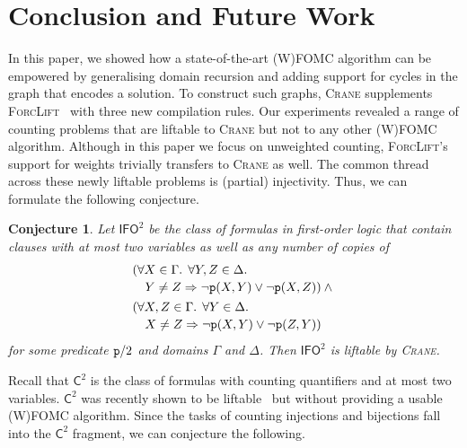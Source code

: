 \documentclass{article}
\newtheorem{conjecture}{Conjecture}
\theoremstyle{definition}
\theoremstyle{remark}
\newcommand{\Ctwo}{$\mathsf{C}^{2}$}
\newcommand{\IFO}{$\mathsf{I}\mathsf{FO}^{2}$}
\begin{document}
\section{Conclusion and Future Work}\label{sec:conclusion}

In this paper, we showed how a state-of-the-art (W)FOMC algorithm can be
empowered by generalising domain recursion and adding support for cycles in the
graph that encodes a solution. To construct such graphs, \textsc{Crane}
supplements \textsc{ForcLift}~\cite{DBLP:conf/ijcai/BroeckTMDR11} with three
new compilation rules. Our experiments revealed a range of counting problems
that are liftable to \textsc{Crane} but not to any other (W)FOMC algorithm.
Although in this paper we focus on unweighted counting, \textsc{ForcLift}'s
support for weights trivially transfers to \textsc{Crane} as well. The common
thread across these newly liftable problems is (partial) injectivity. Thus, we
can formulate the following conjecture.

\begin{conjecture}
  Let \IFO{} be the class of formulas in first-order logic that contain clauses
  with at most two variables as well as any number of copies of
  \begin{align*}
    &\begin{multlined}[t]
      (\forall X \in \Gamma\text{. }\forall Y, Z \in \Delta\text{. }\\
      Y \ne Z \Rightarrow \neg \texttt{\textup{p}}(X, Y) \lor \neg \texttt{\textup{p}}(X, Z)) \land{}
    \end{multlined}\\
    &\begin{multlined}[t]
      (\forall X, Z \in \Gamma\text{. }\forall Y \in \Delta\text{. }\\
      X \ne Z \Rightarrow \neg \texttt{\textup{p}}(X, Y) \lor \neg \texttt{\textup{p}}(Z, Y))
    \end{multlined}
  \end{align*}
  for some predicate $\texttt{\textup{p}}/2$ and domains $\Gamma$ and $\Delta$.
  Then \IFO{} is liftable by \textsc{Crane}.
\end{conjecture}

Recall that \Ctwo{} is the class of formulas with counting quantifiers and at
most two variables. \Ctwo{} was recently shown to be
liftable~\cite{DBLP:journals/jair/Kuzelka21} but without providing a usable
(W)FOMC algorithm. Since the tasks of counting injections and bijections fall
into the \Ctwo{} fragment, we can conjecture the following.
\end{document}
